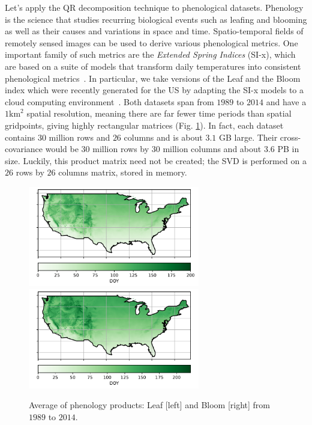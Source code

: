 \documentclass[ijgi,article,submit,moreauthors,pdftex,10pt,a4paper]{Definitions/mdpi}
\begin{document}
Let's apply the QR decomposition technique to phenological datasets. Phenology is the science that studies recurring biological events such as leafing and blooming as well as their causes and variations in space and time. Spatio-temporal fields of remotely sensed images can be used to derive various phenological metrics. One important family of such metrics are the \textit{Extended Spring Indices} (SI-x), which are based on a suite of models that transform daily temperatures into consistent phenological metrics~\cite{Schwartz2013}. In particular, we take versions of the Leaf and the Bloom index which were recently generated for the US by adapting the SI-x models to a cloud computing environment~\cite{izquierdo18}. Both datasets span from $1989$ to $2014$ and have a $1\text{km}^2$ spatial resolution, meaning there are far fewer time periods than spatial gridpoints, giving highly rectangular matrices (Fig. \ref{fig:phenologydata}). In fact, each dataset contains $30$ million rows and $26$ columns and is about $3.1$ GB large. Their cross-covariance would be $30$ million rows by $30$ million columns and about $3.6$ PB in size. Luckily, this product matrix need not be created; the SVD is performed on a $26$ rows by $26$ columns matrix, stored in memory.
\begin{figure}[H]
\centering
\includegraphics[width=7.5cm]{Results/Leafmean.pdf} ~~~~~ \includegraphics[width=7.5cm]{Results/Bloommean.pdf}
\caption{Average of phenology products: Leaf [left] and Bloom [right] from $1989$ to $2014$.}
\label{fig:phenologydata}
\end{figure}
\end{document}

